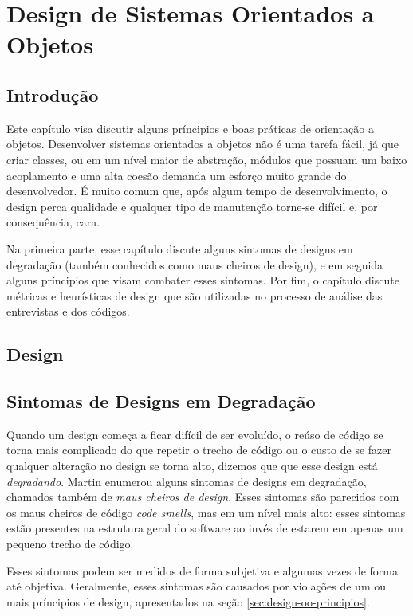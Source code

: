 \chapter{Design de Sistemas Orientados a Objetos}
\label{cap:design}

\section{Introdução}
\label{sec:design-introducao}

Este capítulo visa discutir alguns príncipios e boas práticas de orientação a objetos. Desenvolver sistemas orientados a objetos
não é uma tarefa fácil, já que criar classes, ou em um nível maior de abstração, módulos que possuam um baixo acoplamento
e uma alta coesão demanda um esforço muito grande do desenvolvedor. É muito comum que, após algum tempo de desenvolvimento,
o design perca qualidade e qualquer tipo de manutenção torne-se difícil e, por consequência, cara.

Na primeira parte, esse capítulo discute alguns sintomas de designs em degradação (também conhecidos como maus cheiros de design), 
e em seguida alguns príncipios que visam combater esses sintomas. Por fim, o capítulo discute métricas e heurísticas 
de design que são utilizadas no processo de análise das entrevistas e dos códigos.

\section{Design}


\section{Sintomas de Designs em Degradação}
\label{sec:design-degradacao}
Quando um design começa a ficar difícil de ser evoluído, o reúso de código se torna mais complicado do que repetir o trecho de código ou 
o custo de se fazer qualquer alteração no design se torna alto, dizemos que que
esse design está \textit{degradando}. Martin \cite{bob-martin} enumerou alguns sintomas de designs em degradação, chamados também de \textit{maus cheiros de design}. 
Esses sintomas são parecidos com os maus cheiros de código \textit{code smells}, mas em um nível mais alto: esses sintomas
estão presentes na estrutura geral do software ao invés de estarem em apenas um pequeno trecho de código.

Esses sintomas podem ser medidos de forma subjetiva e algumas vezes de forma até objetiva. Geralmente, esses sintomas são causados
por violações de um ou mais príncipios de design, apresentados na seção \ref{sec:design-oo-principios}. 

